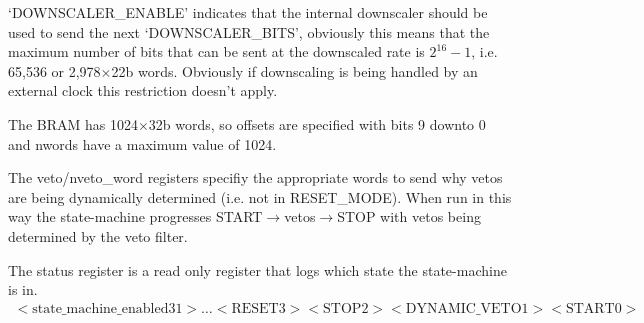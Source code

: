\documentclass[]{article}
\begin{document}
    `DOWNSCALER\_ENABLE' indicates that the internal downscaler should be used to send the next `DOWNSCALER\_BITS', obviously this means that the maximum number of bits that can be sent at the downscaled rate is \(2^16 - 1\), i.e. 65,536 or 2,978\(\times\)22b words. Obviously if downscaling is being handled by an external clock this restriction doesn't apply.

    The BRAM has 1024\( \times \)32b words, so offsets are specified with bits 9 downto 0 and nwords have a maximum value of 1024. 

    The veto/nveto\_word registers specifiy the appropriate words to send why vetos are being dynamically determined (i.e. not in RESET\_MODE). When run in this way the state-machine progresses START\(\rightarrow\)vetos\(\rightarrow\)STOP with vetos being determined by the veto filter.
      
    The status register is a read only register that logs which state the state-machine is in.
    \begin{align} \label{fmt:status_reg}
        <\text{state\_machine\_enabled} 31>\ldots<\text{RESET} 3> <\text{STOP} 2> <\text{DYNAMIC\_VETO} 1> <\text{START} 0>
    \end{align}
	  
\end{document}
